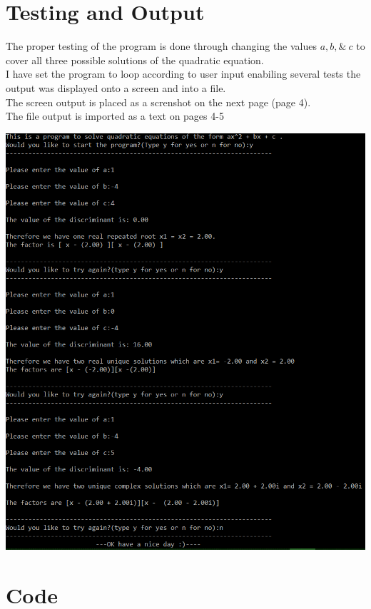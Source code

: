 \documentclass[letterpaper, 24pt, final, onecolumn, titlepage] {article}
\begin{document}
\pagebreak

\section{Testing and Output}
The proper testing of the program is done through changing the values $a, b,\&\ c$ to cover all three possible solutions of the quadratic equation.\\
I have set the program to loop according to user input enabiling several tests the output was displayed onto a screen and into a file.\\
The screen output is placed as a screnshot on the next page (page 4).\\
The file output is imported as a text on pages 4-5

\pagebreak
\begin{center}\includegraphics{output}\end{center}

\pagebreak

\section{Code}
\singlespacing
\end{document}
